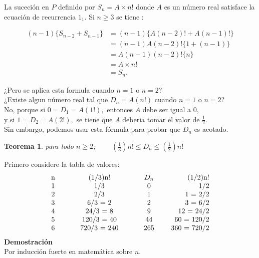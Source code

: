\documentclass[11pt,a4paper]{article}
\newcommand{\ds}{\displaystyle}
\newtheorem{teo}{Teorema}{}
\begin{document}
La suceción en $P$ definido por $S_{n} = A \times n!$ donde $A$ es un número real satisface la ecuación de recurrencia $1_1$. Si $n \geq 3$ se tiene :

\begin{align*}
 (n-1)\{S_{n-2}+S_{n-1}\} &= (n-1)\{A(n-2)! + A(n-1)!\} \\
 						  &= (n-1)A(n-2)!\{1+(n-1)\} \\
 						  &= A(n-1)(n-2)!\{n\}\\
 						  &= A \times n!\\
 						  &= S_{n}.
\end{align*}

¿Pero se aplica esta formula cuando $n=1$ o $n=2$?\\
¿Existe algun número real tal que $D_{n} = A(n!)$ cuando $n=1$ o $n=2$?\\
No, porque si $0 = D_{1} =A(1!),$ entonces $A$ debe ser igual a $0$,\\
y si $1 = D_{2} = A(2!),$ se tiene que $A$ deberia tomar el valor de $\frac{1}{2}$.\\ \newline
Sin embargo, podemos usar esta fórmula para probar que $D_{n}$ es acotado.
\begin{teo}{}
para todo $n \geq 2$; $~~~~~~~~~\ds(\frac{1}{3})n! \leq D_{n} \leq (\frac{1}{2})n!$
\end{teo}
Primero considere la tabla de valores:\\

\begin{equation*}
\begin{tabular}{ c  c c c c c c c r }
   n &  &   &  (1/3)n!     &  & & $D_{n}$ & & (1/2)n! \\
   
   1 &  &   &  1/3         &  & & 0  & &  1/2\\
   
   2 &  &   &  2/3         &  & & 1  & &  1 = 2/2\\
   
   3 &  &   &  6/3 = 2     &  & & 2  & &  3 = 6/2\\
   
   4 &  &   &  24/3 = 8    &  & & 9  & &  12 = 24/2\\
   
   5 &  &   &  120/3 = 40  &  & & 44  & & 60 = 120/2\\
   6 &  &   &  720/3 = 240 &  & & 265 & & 360 = 720/2\\
\end{tabular}
\end{equation*}
\textbf{Demostración}\\
Por inducción fuerte en matemática sobre $n$.\\
\end{document}
